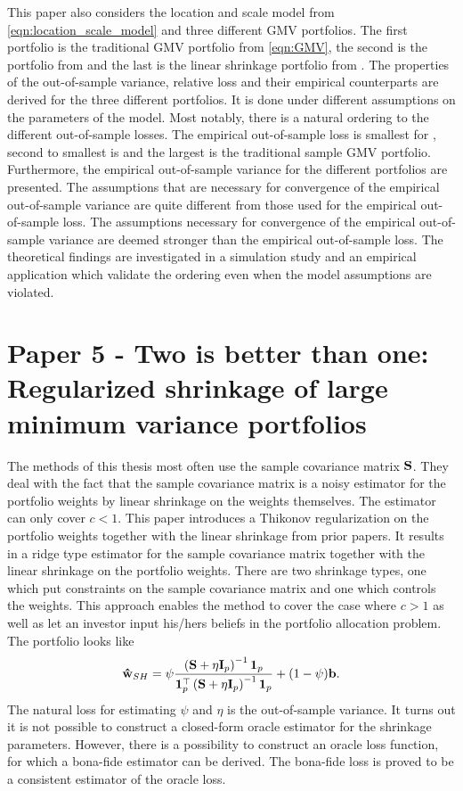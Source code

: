 \documentclass[12pt, oneside]{book}\usepackage{knitr}
\begin{document}
This paper also considers the location and scale model from \eqref{eqn:location_scale_model} and three different GMV portfolios. 
The first portfolio is the traditional GMV portfolio from \eqref{eqn:GMV}, the second is the portfolio from \citet{bodnar2018estimation} and the last is the linear shrinkage portfolio from \citet{frahm2010}.
The properties of the out-of-sample variance, relative loss and their empirical counterparts are derived for the three different portfolios. 
It is done under different assumptions on the parameters of the model.
Most notably, there is a natural ordering to the different out-of-sample losses.
The empirical out-of-sample loss is smallest for \citet{bodnar2018estimation}, second to smallest is \citet{frahm2010} and the largest is the traditional sample GMV portfolio.
Furthermore, the empirical out-of-sample variance for the different portfolios are presented.
The assumptions that are necessary for convergence of the empirical out-of-sample variance are quite different from those used for the empirical out-of-sample loss.
The assumptions necessary for convergence of the empirical out-of-sample variance are deemed stronger than the empirical out-of-sample loss.
The theoretical findings are investigated in a simulation study and an empirical application which validate the ordering even when the model assumptions are violated.

\section{Paper 5 - Two is better than one: Regularized shrinkage of large
minimum variance portfolios}\label{sec:paper5}
The methods of this thesis most often use the sample covariance matrix $\mathbf{S}$.
They deal with the fact that the sample covariance matrix is a noisy estimator for the portfolio weights by linear shrinkage on the weights themselves.
The estimator can only cover $c<1$.
This paper introduces a Thikonov regularization on the portfolio weights together with the linear shrinkage from prior papers. 
It results in a ridge type estimator for the sample covariance matrix together with the linear shrinkage on the portfolio weights.
There are two shrinkage types, one which put constraints on the sample covariance matrix and one which controls the weights.
This approach enables the method to cover the case where $c>1$ as well as let an investor input his/hers beliefs in the portfolio allocation problem.
The portfolio looks like
$$
\mathbf{\hat{w}}_{SH} = \psi \frac{\left(\mathbf{S} + \eta \mathbf{I}_p \right)^{-1}\mathbf{1}_p}{\mathbf{1}_p^\top\left(\mathbf{S} + \eta \mathbf{I}_p \right)^{-1}\mathbf{1}_p} + (1-\psi)\mathbf{b}.
$$
The natural loss for estimating $\psi$ and $\eta$ is the out-of-sample variance.
It turns out it is not possible to construct a closed-form oracle estimator for the shrinkage parameters.
However, there is a possibility to construct an oracle loss function, for which a bona-fide estimator can be derived.
The bona-fide loss is proved to be a consistent estimator of the oracle loss.
\end{document}
